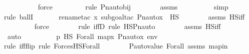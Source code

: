 \begin{isabellebody}
\ \ \ \ \ \ \ \ \isamarkupfalse%
\ force\ \isanewline
\ \ \ \ \ \ \ \isamarkupfalse%
{\isacharparenleft}{\kern0pt}rule\ Pn{\isacharunderscore}{\kern0pt}auto{\isacharunderscore}{\kern0pt}bij{\isacharparenright}{\kern0pt}\isanewline
\ \ \ \ \ \ \isamarkupfalse%
\ assms\ \isanewline
\ \ \ \ \ \ \ \isamarkupfalse%
\ simp\isanewline
\ \ \ \ \ \ \isamarkupfalse%
{\isacharparenleft}{\kern0pt}rule\ ballI{\isacharparenright}{\kern0pt}\isanewline
\ \ \ \ \ \ \isamarkupfalse%
{\isacharparenleft}{\kern0pt}rename{\isacharunderscore}{\kern0pt}tac\ x{\isacharcomma}{\kern0pt}\ subgoal{\isacharunderscore}{\kern0pt}tac\ {\isachardoublequoteopen}Pn{\isacharunderscore}{\kern0pt}auto{\isacharparenleft}{\kern0pt}{\isasympi}{\isacharparenright}{\kern0pt}{\isacharbackquote}{\kern0pt}x\ {\isasymin}\ HS{\isachardoublequoteclose}{\isacharparenright}{\kern0pt}\isanewline
\ \ \ \ \ \ \isamarkupfalse%
\ assms\ HS{\isacharunderscore}{\kern0pt}iff\isanewline
\ \ \ \ \ \ \ \isamarkupfalse%
\ force\ \isanewline
\ \ \ \ \ \ \isamarkupfalse%
{\isacharparenleft}{\kern0pt}rule\ iffD{}{\isacharcomma}{\kern0pt}\ rule\ HS{\isacharunderscore}{\kern0pt}Pn{\isacharunderscore}{\kern0pt}auto{\isacharparenright}{\kern0pt}\isanewline
\ \ \ \ \ \ \isamarkupfalse%
\ assms\ HS{\isacharunderscore}{\kern0pt}iff\isanewline
\ \ \ \ \ \ \isamarkupfalse%
\ auto\isanewline
\ \ \ \ \isamarkupfalse%
\ \isamarkupfalse%
\ {\isachardoublequoteopen}{\isachardot}{\kern0pt}{\isachardot}{\kern0pt}{\isachardot}{\kern0pt}\ {\isasymlongleftrightarrow}\ {\isasympi}{\isacharbackquote}{\kern0pt}p\ {\isasymtturnstile}HS\ Forall{\isacharparenleft}{\kern0pt}{\isasymphi}{\isacharparenright}{\kern0pt}\ map{\isacharparenleft}{\kern0pt}{\isasymlambda}x{\isachardot}{\kern0pt}\ Pn{\isacharunderscore}{\kern0pt}auto{\isacharparenleft}{\kern0pt}{\isasympi}{\isacharparenright}{\kern0pt}{\isacharbackquote}{\kern0pt}x{\isacharcomma}{\kern0pt}\ env{\isacharparenright}{\kern0pt}{\isachardoublequoteclose}\ \isanewline
\ \ \ \ \ \ \isamarkupfalse%
{\isacharparenleft}{\kern0pt}rule\ iff{\isacharunderscore}{\kern0pt}flip{\isacharcomma}{\kern0pt}\ rule\ ForcesHS{\isacharunderscore}{\kern0pt}Forall{\isacharparenright}{\kern0pt}\isanewline
\ \ \ \ \ \ \isamarkupfalse%
\ P{\isacharunderscore}{\kern0pt}auto{\isacharunderscore}{\kern0pt}value\ Forall\ assms\ mapin\ \isanewline
\ \ \ \ \ \ \isamarkupfalse%

\end{isabellebody}
